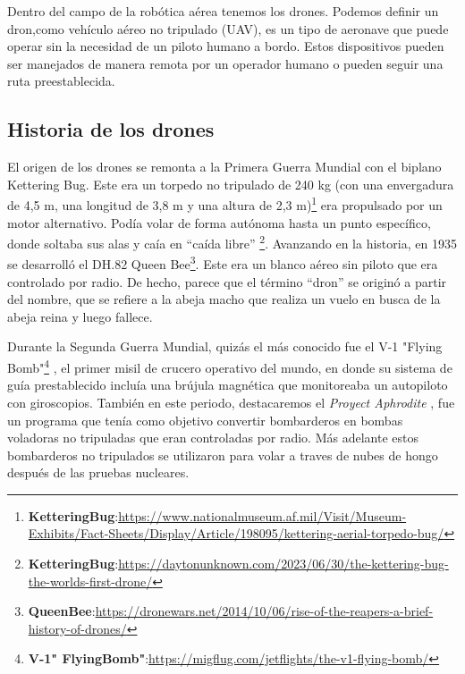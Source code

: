 Dentro del campo de la robótica aérea tenemos los drones. Podemos definir un dron,como vehículo aéreo no tripulado (UAV), es un tipo de aeronave que puede operar sin la necesidad de un piloto humano a bordo. Estos dispositivos pueden ser manejados de manera remota por un operador humano o pueden seguir una ruta
preestablecida. \\

\subsection{Historia de los drones}
\label{sec:subseccion}
El origen de los drones se remonta a la Primera Guerra Mundial con el biplano Kettering Bug.
Este era un torpedo no tripulado de 240 kg (con una envergadura de 4,5 m, una longitud de
3,8 m y una altura de 2,3 m)\footnote{\textbf{KetteringBug}:\url{https://www.nationalmuseum.af.mil/Visit/Museum-Exhibits/Fact-Sheets/Display/Article/198095/kettering-aerial-torpedo-bug/}} era propulsado por un motor alternativo. Podía volar de
forma autónoma hasta un punto específico, donde soltaba sus alas y caía en “caída libre” \footnote{\textbf{KetteringBug}:\url{https://daytonunknown.com/2023/06/30/the-kettering-bug-the-worlds-first-drone/}}.\newline
Avanzando en la historia, en 1935 se desarrolló el DH.82 Queen Bee\footnote{\textbf{QueenBee}:\url{https://dronewars.net/2014/10/06/rise-of-the-reapers-a-brief-history-of-drones/}}. Este era un blanco aéreo sin piloto que era controlado por radio. De hecho, parece que el término “dron” se originó a partir del nombre, que se refiere a la abeja macho que realiza un vuelo en busca de la abeja reina y luego fallece. 

Durante la Segunda Guerra Mundial, quizás el más conocido fue el V-1 "Flying Bomb"\footnote{\textbf{V-1" FlyingBomb"}:\url{https://migflug.com/jetflights/the-v1-flying-bomb/}} , el primer misil
de crucero operativo del mundo, en donde su sistema de guía prestablecido incluía una brújula magnética que monitoreaba un autopiloto con giroscopios. También en este periodo, destacaremos el \textit{Proyect Aphrodite} \cite{Aphrodite}, fue un programa que tenía como objetivo convertir bombarderos en bombas voladoras no tripuladas que eran controladas por radio. Más adelante estos bombarderos no tripulados se utilizaron para volar a traves de nubes de hongo
después de las pruebas nucleares.

